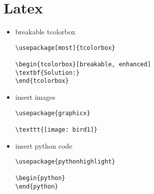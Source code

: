 \documentclass[twoside,12pt]{article}
\begin{document}
\section{Latex}
\begin{itemize}
\item breakable tcolorbox \\
\begin{lstlisting}
\usepackage[most]{tcolorbox}

\begin{tcolorbox}[breakable, enhanced]
\textbf{Solution:}
\end{tcolorbox}
\end{lstlisting}

\item insert images \\
\begin{lstlisting}
\usepackage{graphicx}

\texttt{[image: bird1]}
\end{lstlisting}


\item insert python code \\
\begin{lstlisting}
\usepackage{pythonhighlight}

\begin{python}
\end{python}


\end{lstlisting}
\end{itemize}
\end{document}
